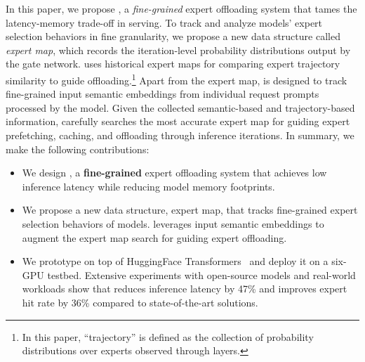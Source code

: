 In this paper, we propose \sys, a \textit{fine-grained} expert offloading system that tames the latency-memory trade-off in \MoE serving.
%
To track and analyze \MoE models' expert selection behaviors in fine granularity, we propose a new data structure called \textit{expert map}, which records the iteration-level probability distributions output by the gate network.
\sys uses historical expert maps for comparing expert trajectory similarity to guide offloading.\footnote{In this paper, ``trajectory'' is defined as the collection of probability distributions over experts observed through layers.}
%
Apart from the expert map, \sys is designed to track fine-grained input semantic embeddings from individual request prompts processed by the \MoE model.
Given the collected semantic-based and trajectory-based information, \sys carefully searches the most accurate expert map for guiding expert prefetching, caching, and offloading through inference iterations.
%
In summary, we make the following contributions:
\begin{itemize}[noitemsep,topsep=0pt,parsep=0pt,partopsep=0pt]
    \item We design \sys, a \textbf{fine-grained} expert offloading system that achieves low inference latency while reducing model memory footprints.
    \item We propose a new data structure, expert map, that tracks fine-grained expert selection behaviors of \MoE models. \sys leverages input semantic embeddings to augment the expert map search for guiding expert offloading.
    \item We prototype \sys on top of HuggingFace Transformers~\cite{wolf2020huggingface} and deploy it on a six-GPU testbed. Extensive experiments with open-source \MoE models and real-world workloads show that \sys reduces inference latency by 47\% and improves expert hit rate by 36\% compared to state-of-the-art solutions.
\end{itemize}


